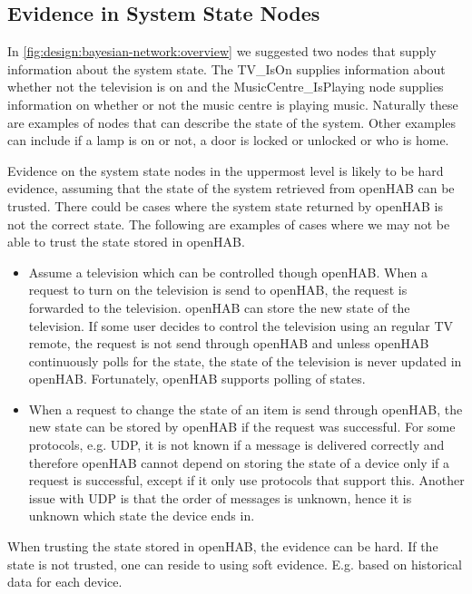 \subsection{Evidence in System State Nodes}
\label{sec:design:bayesian-network:system-state-nodes-evidence}

In \cref{fig:design:bayesian-network:overview} we suggested two nodes that supply information about the system state. The TV\_IsOn supplies information about whether not the television is on and the MusicCentre\_IsPlaying node supplies information on whether or not the music centre is playing music. Naturally these are examples of nodes that can describe the state of the system. Other examples can include if a lamp is on or not, a door is locked or unlocked or who is home.

Evidence on the system state nodes in the uppermost level is likely to be hard evidence, assuming that the state of the system retrieved from openHAB can be trusted. There could be cases where the system state returned by openHAB is not the correct state. The following are examples of cases where we may not be able to trust the state stored in openHAB.

\begin{itemize}
\item Assume a television which can be controlled though openHAB. When a request to turn on the television is send to openHAB, the request is forwarded to the television. openHAB can store the new state of the television. If some user decides to control the television using an regular TV remote, the request is not send through openHAB and unless openHAB continuously polls for the state, the state of the television is never updated in openHAB. Fortunately, openHAB supports polling of states.
\item When a request to change the state of an item is send through openHAB, the new state can be stored by openHAB if the request was successful. For some protocols, e.g. UDP, it is not known if a message is delivered correctly and therefore openHAB cannot depend on storing the state of a device only if a request is successful, except if it only use protocols that support this. Another issue with UDP is that the order of messages is unknown, hence it is unknown which state the device ends in.
\end{itemize}

When trusting the state stored in openHAB, the evidence can be hard. If the state is not trusted, one can reside to using soft evidence. E.g. based on historical data for each device.

